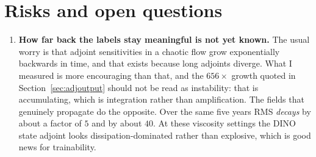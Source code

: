 \section{Risks and open questions}
\label{sec:risks}

\begin{enumerate}
  \item \textbf{How far back the labels stay meaningful is not yet known.}
        The usual worry is that adjoint sensitivities in a chaotic flow grow
        exponentially backwards in time, and that  exists
        because long adjoints diverge. What I measured is more encouraging than
        that, and the $656\times$ growth quoted in Section~\ref{sec:adjoutput} should not be
        read
        as instability: that is  accumulating, which is
        integration rather than amplification. The fields that genuinely
        propagate do the opposite. Over the same five years  RMS
        \emph{decays} by about a factor of $5$ and  by about
        $40$. At these viscosity settings the DINO state adjoint looks
        dissipation-dominated rather than explosive, which is good news for
        trainability.


\end{enumerate}

